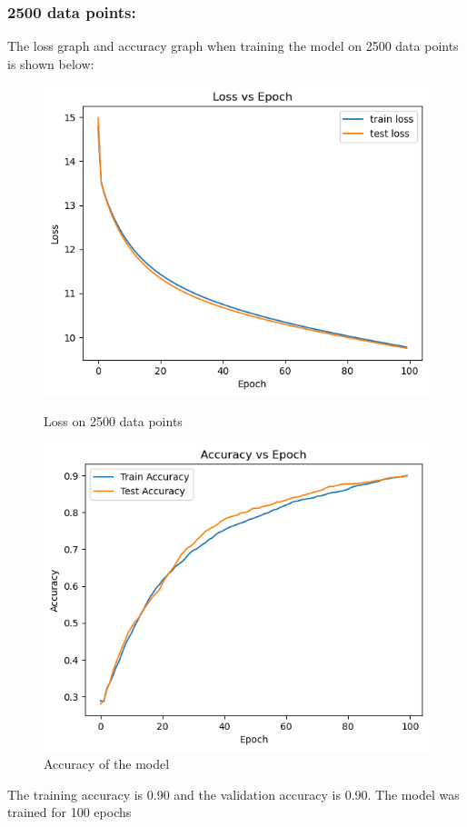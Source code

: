 \documentclass{article}
\begin{document}
\subsubsection*{2500 data points:}
The loss graph and accuracy graph when training the model on 2500 data points is shown below:
\begin{figure}[h!]
    \centering
    \begin{minipage}{0.45\textwidth}
        \centering
        \includegraphics[width=1\textwidth]{loss_2500.png} %
        \caption{Loss on 2500 data points}
    \end{minipage}\hfill
    \begin{minipage}{0.45\textwidth}
        \centering
        \includegraphics[width=1\textwidth]{accuracy_2500.png} %
        \caption{Accuracy of the model}
    \end{minipage}
\end{figure}
\newline The training accuracy is 0.90 and the validation accuracy is 0.90. The model was trained for 100 epochs
\end{document}
